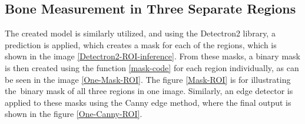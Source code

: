 \subsection{Bone Measurement in Three Separate Regions}
The created model is similarly utilized, and using the Detectron2 library, a prediction is applied, which creates a mask for each of the regions, which is shown in the image \ref{Detectron2-ROI-inference}. From these masks, a binary mask is then created using the function \ref{mask-code} for each region individually, as can be seen in the image \ref{One-Mask-ROI}. The figure \ref{Mask-ROI} is for illustrating the~binary mask of all three regions in one image. Similarly, an edge detector is applied to these masks using the Canny edge method, where the final output is shown in the figure \ref{One-Canny-ROI}. %

